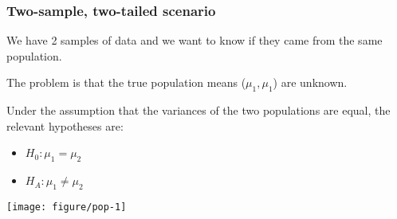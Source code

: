\documentclass[color=usenames,dvipsnames]{beamer}\usepackage[]{graphicx}\usepackage[]{color}
\makeatletter
\def\maxwidth{ %
  \ifdim\Gin@nat@width>\linewidth
    \linewidth
  \else
    \Gin@nat@width
  \fi
}
\newenvironment{knitrout}{}{} %
\makeatother
\begin{document}
\begin{frame}[fragile]
  \frametitle{Two-sample, two-tailed scenario}
  \small
  We have 2 samples of data and we want to know if they came from
  the same population. \\
  \pause
  \vfill

  The problem is that the true population means ($\mu_1, \mu_1$) are
  unknown. \\ %
  \pause
  \vfill

Under the assumption that the variances of the two populations are
equal, the relevant hypotheses are:
\begin{itemize}
  \footnotesize
  \item $H_0: \mu_1 = \mu_2$
  \item $H_A: \mu_1 \neq \mu_2$
\end{itemize}
  \normalsize
  \pause
  \vfill
\begin{knitrout}
\color{fgcolor}
\texttt{[image: figure/pop-1]} 

\end{knitrout}
\end{frame}
\end{document}
